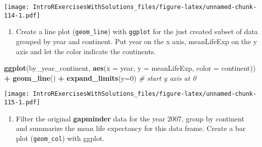 \documentclass[]{article}
\newenvironment{Shaded}{\begin{snugshade}}{\end{snugshade}}
\newcommand{\KeywordTok}[1]{\textcolor[rgb]{0.13,0.29,0.53}{\textbf{#1}}}
\newcommand{\DataTypeTok}[1]{\textcolor[rgb]{0.13,0.29,0.53}{#1}}
\newcommand{\DecValTok}[1]{\textcolor[rgb]{0.00,0.00,0.81}{#1}}
\newcommand{\StringTok}[1]{\textcolor[rgb]{0.31,0.60,0.02}{#1}}
\newcommand{\CommentTok}[1]{\textcolor[rgb]{0.56,0.35,0.01}{\textit{#1}}}
\newcommand{\OperatorTok}[1]{\textcolor[rgb]{0.81,0.36,0.00}{\textbf{#1}}}
\newcommand{\NormalTok}[1]{#1}
\providecommand{\tightlist}{%
  \setlength{\itemsep}{0pt}\setlength{\parskip}{0pt}}
\begin{document}
\texttt{[image: IntroRExercisesWithSolutions\_files/figure-latex/unnamed-chunk-114-1.pdf]}

\begin{enumerate}
\def\labelenumi{\arabic{enumi}.}
\setcounter{enumi}{9}
\tightlist
\item
  Create a line plot (\texttt{geom\_line}) with \texttt{ggplot} for the
  just created subset of data grouped by year and continent. Put year on
  the x axis, meanLifeExp on the y axis and let the color indicate the
  continents.
\end{enumerate}

\begin{Shaded}
\begin{Highlighting}[]
\KeywordTok{ggplot}\NormalTok{(by_year_continent, }\KeywordTok{aes}\NormalTok{(}\DataTypeTok{x =}\NormalTok{ year, }\DataTypeTok{y =}\NormalTok{ meanLifeExp, }\DataTypeTok{color =}\NormalTok{ continent)) }\OperatorTok{+}
\StringTok{  }\KeywordTok{geom_line}\NormalTok{() }\OperatorTok{+}\StringTok{ }
\StringTok{  }\KeywordTok{expand_limits}\NormalTok{(}\DataTypeTok{y=}\DecValTok{0}\NormalTok{) }\CommentTok{# start y axis at 0}
\end{Highlighting}
\end{Shaded}

\texttt{[image: IntroRExercisesWithSolutions\_files/figure-latex/unnamed-chunk-115-1.pdf]}

\begin{enumerate}
\def\labelenumi{\arabic{enumi}.}
\setcounter{enumi}{10}
\tightlist
\item
  Filter the original \textbf{gapminder} data for the year 2007, group
  by continent and summarize the mean life expectancy for this data
  frame. Create a bar plot (\texttt{geom\_col}) with ggplot.
\end{enumerate}

\begin{Shaded}
\end{Shaded}
\end{document}
